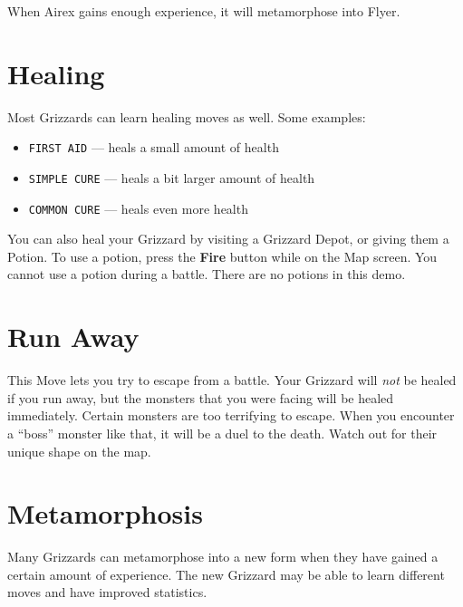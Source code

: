 \documentclass[10pt,twocolumn,openany,article]{memoir}
\begin{document}
When Airex gains enough experience, it will metamorphose into Flyer.

\fi

\pagebreak

\section{Healing}

Most Grizzards can learn healing moves as well. Some examples:

\begin{itemize}
\item \texttt{FIRST AID} --- heals a small amount of health
\item \texttt{SIMPLE CURE} --- heals a bit larger amount of health
\item \texttt{COMMON CURE} --- heals even more health
\end{itemize}

You can also heal your Grizzard  by visiting a Grizzard Depot, or giving
them a Potion. To use a  potion, press the \textbf{Fire} button while on
the Map screen. You cannot use a potion during a battle. \ifdefined\DEMO
There are no potions in this demo. \fi

\section{Run Away}

This  Move lets  you try  to escape  from a  battle. Your  Grizzard will
\emph{not} be  healed if you  run away, but  the monsters that  you were
facing will be  healed immediately. Certain monsters  are too terrifying
to escape. When  you encounter a ``boss'' monster like  that, it will be
a duel to the death. Watch out for their unique shape on the map.

\section{Metamorphosis}

Many Grizzards  can metamorphose into a  new form when they  have gained
a certain  amount of experience. The  new Grizzard may be  able to learn
different moves and have improved statistics.

\pagebreak
{}
\end{document}
